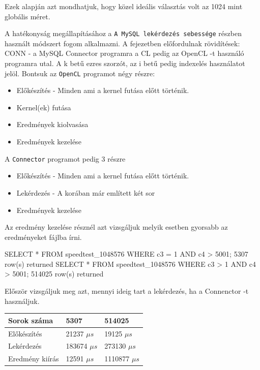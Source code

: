 Ezek alapján azt mondhatjuk, hogy közel ideális választás volt az 1024 mint globális méret.


A hatékonyság megállapításához a \texttt{A MySQL lekérdezés sebessége} részben használt módszert fogom alkalmazni.
A fejezetben előfordulnak rövidítések: CONN - a MySQL Connector programra a CL pedig az OpenCL -t használó programra utal. 
A k betű ezres szorzót, az i betű pedig indexelés használatot jelöl.
\newline Bontsuk az \texttt{OpenCL} programot négy részre:
\begin{itemize}
\item Előkészítés - Minden ami a kernel futása előtt történik.
\item Kernel(ek) futása
\item Eredmények kiolvasása
\item Eredmények kezelése
\end{itemize}
A \texttt{Connector} programot pedig 3 részre
\begin{itemize}
\item Előkészítés - Minden ami a kernel futása előtt történik.
\item Lekérdezés - A korában már említett két sor
\item Eredmények kezelése
\end{itemize}
Az eredmény kezelése résznél azt vizsgáljuk melyik esetben gyorsabb az eredményeket fájlba írni.


\begin{python}
SELECT * FROM speedtest_1048576 WHERE c3 = 1 AND c4 > 5001;
	5307 row(s) returned
SELECT * FROM speedtest_1048576 WHERE c3 > 1 AND c4 > 5001;
	514025 row(s) returned
\end{python}
Először vizsgáljuk meg azt, mennyi ideig tart a lekérdezés, ha a Connenctor -t használjuk.

\begin{table}[h!]
\centering
\begin{tabular}{|p{6cm}|p{3cm}|p{3cm}|}
\hline
Sorok száma & 5307 & 514025 \\
\hline\hline

Előkészítés & 21237 $\mu s$ & 19125 $\mu s$ \\
\hline

Lekérdezés & 183674 $\mu s$ & 273130 $\mu s$ \\
\hline

Eredmény kiírás & 12591 $\mu s$ & 1110877 $\mu s$ \\
\hline
\end{tabular}
\end{table}

